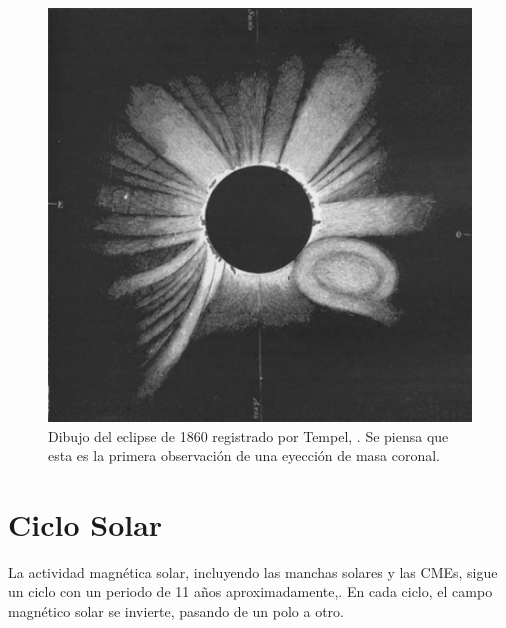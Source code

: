 \begin{figure}[H]
    \centering
    \includegraphics[width=0.7\linewidth]{imag/Primera_CME.png}
    \caption[Dibujo del eclipse de 1860 con la primera observación de una Eyección de Masa Coronal]{Dibujo del eclipse de 1860 registrado por Tempel, \cite{1879MmRAS..41..483.}. Se piensa que esta es la primera observación de una eyección de masa coronal.}
    \label{fig:PrimeraCME}
\end{figure}


\section{Ciclo Solar}
La actividad magnética solar, incluyendo las manchas solares y las CMEs, sigue un ciclo con un periodo de 11 años aproximadamente,\cite[e.g.,][]{hathaway-2015}. En cada ciclo, el campo magnético solar se invierte, pasando de un polo a otro.




